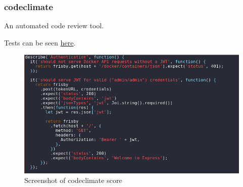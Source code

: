 \documentclass[]{article}
\begin{document}
\subsubsection{codeclimate}
An automated code review tool.

Tests can be seen \href{https://codeclimate.com/github/TripleParity/docks-ui}{here}.
\begin{figure}[H]
	\centering
	\includegraphics[scale=0.5]{jest.png}
	\caption{Screenshot of codeclimate score}
\end{figure}
\end{document}

